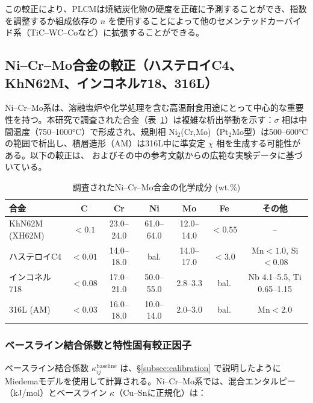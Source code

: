 \documentclass[12pt,a4paper]{article}
\begin{document}
	この較正により、PLCMは焼結炭化物の硬度を正確に予測することができ、指数を調整するか組成依存の $n$ を使用することによって他のセメンテッドカーバイド系（TiC–WC–Coなど）に拡張することができる。
	
	
	\subsection{Ni–Cr–Mo合金の較正（ハステロイC4、KhN62M、インコネル718、316L）}
	\label{subsec:calibration_nicrmo}
	
	Ni–Cr–Mo系は、溶融塩炉や化学処理を含む高温耐食用途にとって中心的な重要性を持つ。本研究で調査された合金（表~\ref{tab:nicrmo_compositions}）は複雑な析出挙動を示す：$\sigma$ 相は中間温度（750–1000°C）で形成され、規則相 Ni$_2$(Cr,Mo)（Pt$_2$Mo型）は500–600°Cの範囲で析出し、積層造形（AM）は316L中に準安定 $\chi$ 相を生成する可能性がある。以下の較正は、\cite{dis2025} およびその中の参考文献からの広範な実験データに基づいている。
	
	\begin{table}[htbp]
		\centering
		\caption{調査されたNi–Cr–Mo合金の化学成分 (wt.\%)}
		\label{tab:nicrmo_compositions}
		\begin{tabular}{lcccccc}
			\toprule
			\textbf{合金} & \textbf{C} & \textbf{Cr} & \textbf{Ni} & \textbf{Mo} & \textbf{Fe} & \textbf{その他} \\
			\midrule
			KhN62M (XH62M) & \(<0.1\) & 23.0–24.0 & 61.0–64.0 & 12.0–14.0 & \(<0.55\) & – \\
			ハステロイC4   & \(<0.01\) & 14.0–18.0 & bal. & 14.0–17.0 & \(<3.0\) & Mn\(<1.0\), Si\(<0.08\) \\
			インコネル718    & \(<0.08\) & 17.0–21.0 & 50.0–55.0 & 2.8–3.3 & bal. & Nb 4.1–5.5, Ti 0.65–1.15 \\
			316L (AM)      & \(<0.03\) & 16.0–18.0 & 10.0–14.0 & 2.0–3.0 & bal. & Mn\(<2.0\) \\
			\bottomrule
		\end{tabular}
	\end{table}
	
	\subsubsection{ベースライン結合係数と特性固有較正因子}
	ベースライン結合係数 $\kappa_{ij}^{\text{baseline}}$ は、\S\ref{subsec:calibration} で説明したようにMiedemaモデルを使用して計算される。Ni–Cr–Mo系では、混合エンタルピー（kJ/mol）とベースライン $\kappa$（Cu–Snに正規化）は：
	
\end{document}
